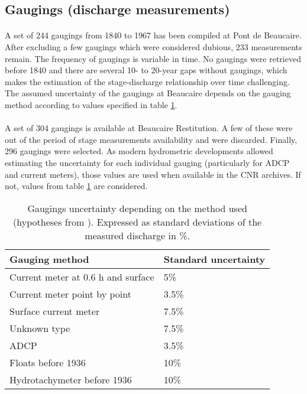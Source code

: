     \subsection{Gaugings (discharge measurements)}

    \paragraph{}
    A set of 244 gaugings from 1840 to 1967 has been compiled at Pont de Beaucaire. After excluding a few gaugings which were considered dubious, 233 measurements remain. The frequency of gaugings is variable in time. No gaugings were retrieved before 1840 and there are several 10- to 20-year gaps without gaugings, which makes the estimation of the stage-discharge relationship over time challenging. The assumed uncertainty of the gaugings at Beaucaire depends on the gauging method according to \citet{bard_actualisation_2018} values specified in table \ref{TabIcJau}.
    
    \paragraph{}    
    A set of 304 gaugings is available at Beaucaire Restitution. A few of these were out of the period of stage measurements availability and were discarded. Finally, 296 gaugings were selected. As modern hydrometric developments allowed estimating the uncertainty for each individual gauging (particularly for ADCP and current meters), those values are used when available in the CNR archives. If not, values from table \ref{TabIcJau} are considered. 
        
         \begin{table}[ht]
            \centering
                \begin{tabular}{| l | l |} 
                        \hline
                        \textbf{Gauging method} & \textbf{Standard uncertainty} \\
                        \hline
                        Current meter at 0.6 h and surface & 5\% \\
                        \hline
                        Current meter point by point & 3.5\% \\
                        \hline
                        Surface current meter & 7.5\% \\
                        \hline
                        Unknown type & 7.5\% \\
                        \hline
                        ADCP & 3.5\% \\
                        \hline
                        Floats before 1936 & 10\% \\
                        \hline
                        Hydrotachymeter before 1936 & 10\%\\
                        \hline
                \end{tabular}
            \caption{Gaugings uncertainty depending on the method used (hypotheses from \citet{bard_actualisation_2018}). Expressed as standard deviations of the measured discharge in \%.}
            \label{TabIcJau}
        \end{table}
         \FloatBarrier
